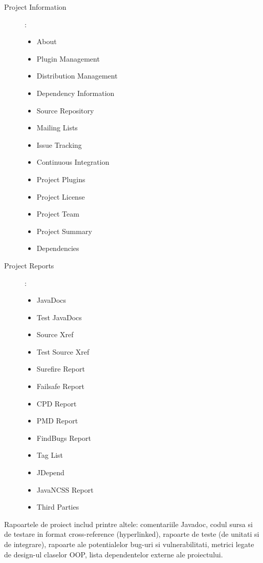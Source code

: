 \begin{description}

\item [Project Information] :

\begin{itemize}
\item    About
\item    Plugin Management
\item    Distribution Management
\item    Dependency Information
\item    Source Repository
\item    Mailing Lists
\item    Issue Tracking
\item    Continuous Integration
\item    Project Plugins
\item    Project License
\item    Project Team
\item    Project Summary
\item    Dependencies
\end{itemize}

\item [Project Reports] :

\begin{itemize}
\item    JavaDocs
\item    Test JavaDocs
\item    Source Xref
\item    Test Source Xref
\item    Surefire Report
\item    Failsafe Report
\item    CPD Report
\item    PMD Report
\item    FindBugs Report
\item    Tag List
\item    JDepend
\item    JavaNCSS Report
\item    Third Parties
\end{itemize}
\end{description}

Rapoartele de proiect includ printre altele: 
comentariile Javadoc, 
codul sursa si de testare in format cross-reference (hyperlinked), 
rapoarte de teste (de unitati si de integrare),
rapoarte ale potentialelor bug-uri si vulnerabilitati,
metrici legate de design-ul claselor OOP, 
lista dependentelor externe ale proiectului. 

